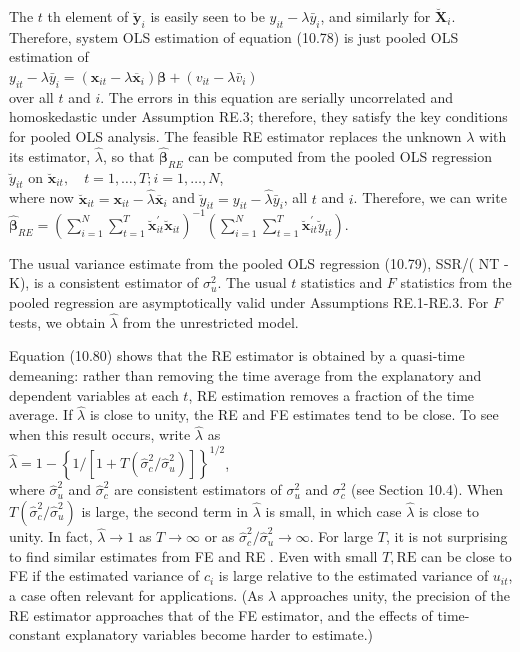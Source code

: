 \documentclass[10pt]{article}
\begin{document}
The $t$ th element of $\breve{\mathbf{y}}_{i}$ is easily seen to be $y_{i t}-\lambda \bar{y}_{i}$, and similarly for $\breve{\mathbf{X}}_{i}$. Therefore, system OLS estimation of equation (10.78) is just pooled OLS estimation of\\
$y_{i t}-\lambda \bar{y}_{i}=\left(\mathbf{x}_{i t}-\lambda \overline{\mathbf{x}}_{i}\right) \boldsymbol{\beta}+\left(v_{i t}-\lambda \bar{v}_{i}\right)$\\
over all $t$ and $i$. The errors in this equation are serially uncorrelated and homoskedastic under Assumption RE.3; therefore, they satisfy the key conditions for pooled OLS analysis. The feasible RE estimator replaces the unknown $\lambda$ with its estimator, $\hat{\lambda}$, so that $\hat{\boldsymbol{\beta}}_{R E}$ can be computed from the pooled OLS regression\\
$\breve{y}_{i t}$ on $\breve{\mathbf{x}}_{i t}, \quad t=1, \ldots, T ; i=1, \ldots, N$,\\
where now $\breve{\mathbf{x}}_{i t}=\mathbf{x}_{i t}-\hat{\lambda} \overline{\mathbf{x}}_{i}$ and $\breve{y}_{i t}=y_{i t}-\hat{\lambda} \bar{y}_{i}$, all $t$ and $i$. Therefore, we can write\\
$\hat{\boldsymbol{\beta}}_{R E}=\left(\sum_{i=1}^{N} \sum_{t=1}^{T} \breve{\mathbf{x}}_{i t}^{\prime} \breve{\mathbf{x}}_{i t}\right)^{-1}\left(\sum_{i=1}^{N} \sum_{t=1}^{T} \breve{\mathbf{x}}_{i t}^{\prime} \breve{y}_{i t}\right)$.

The usual variance estimate from the pooled OLS regression (10.79), SSR/( NT - K), is a consistent estimator of $\sigma_{u}^{2}$. The usual $t$ statistics and $F$ statistics from the pooled regression are asymptotically valid under Assumptions RE.1-RE.3. For $F$ tests, we obtain $\hat{\lambda}$ from the unrestricted model.

Equation (10.80) shows that the RE estimator is obtained by a quasi-time demeaning: rather than removing the time average from the explanatory and dependent variables at each $t$, RE estimation removes a fraction of the time average. If $\hat{\lambda}$ is close to unity, the RE and FE estimates tend to be close. To see when this result occurs, write $\hat{\lambda}$ as\\
$\hat{\lambda}=1-\left\{1 /\left[1+T\left(\hat{\sigma}_{c}^{2} / \hat{\sigma}_{u}^{2}\right)\right]\right\}^{1 / 2}$,\\
where $\hat{\sigma}_{u}^{2}$ and $\hat{\sigma}_{c}^{2}$ are consistent estimators of $\sigma_{u}^{2}$ and $\sigma_{c}^{2}$ (see Section 10.4). When $T\left(\hat{\sigma}_{c}^{2} / \hat{\sigma}_{u}^{2}\right)$ is large, the second term in $\hat{\lambda}$ is small, in which case $\hat{\lambda}$ is close to unity. In fact, $\hat{\lambda} \rightarrow 1$ as $T \rightarrow \infty$ or as $\hat{\sigma}_{c}^{2} / \hat{\sigma}_{u}^{2} \rightarrow \infty$. For large $T$, it is not surprising to find similar estimates from FE and RE . Even with small $T, \mathrm{RE}$ can be close to FE if the estimated variance of $c_{i}$ is large relative to the estimated variance of $u_{i t}$, a case often relevant for applications. (As $\lambda$ approaches unity, the precision of the RE estimator approaches that of the FE estimator, and the effects of time-constant explanatory variables become harder to estimate.)
\end{document}
